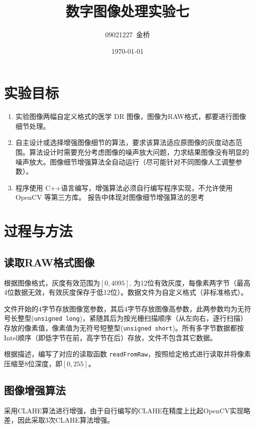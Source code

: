 \documentclass{article}
\title{数字图像处理实验七}
\author{09021227~金桥}
\date{\today}
\begin{document}
\maketitle

\section{实验目标}


\begin{enumerate}
    \item 实验图像两幅自定义格式的医学 DR 图像，图像为RAW格式，都要进行图像细节处理。
    \item 自主设计或选择增强图像细节的算法，要求该算法适应原图像的灰度动态范围。算法设计时需要充分考虑图像的噪声放大问题，力求结果图像没有明显的噪声放大。图像细节增强算法全自动运行（尽可能针对不同图像人工调整参数）。 
    \item 程序使用 C++语言编写，增强算法必须自行编写程序实现，不允许使用OpenCV 等第三方库。 报告中体现对图像细节增强算法的思考
\end{enumerate}

\section{过程与方法}

\subsection{读取RAW格式图像}

根据图像格式，灰度有效范围为$[0, 4095]$, 为12位有效灰度，每像素两字节（最高4位数据无效，有效灰度保存于低12位）。数据文件为自定义格式（非标准格式）。

文件开始的4字节存放图像宽参数，其后4字节存放图像高参数，此两参数均为无符号长整型(\texttt{unsigned long})，紧随其后为按光栅扫描顺序（从左向右，逐行扫描）存放的像素值，像素值为无符号短整型(\texttt{unsigned short})。所有多字节数据都按Intel顺序（即低字节在前，高字节在后）存放，文件不包含其它数据。

根据描述，编写了对应的读取函数 \texttt{readFromRaw}，按照给定格式进行读取并将像素压缩至8位深度，即$[0, 255]$。

\subsection{图像增强算法}

采用CLAHE算法进行增强，由于自行编写的CLAHE在精度上比起OpenCV实现略差，因此采取3次CLAHE算法增强。
\end{document}
